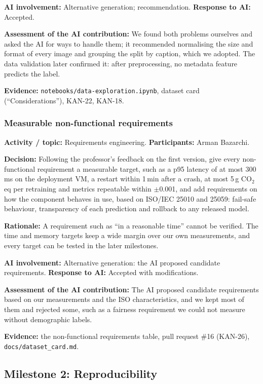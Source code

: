 \documentclass[11pt]{article}
\begin{document}
\noindent\textbf{AI involvement:} Alternative generation; recommendation. \textbf{Response to AI:} Accepted.

\noindent\textbf{Assessment of the AI contribution:} We found both problems ourselves and asked the AI for ways to handle them; it recommended normalising the size and format of every image and grouping the split by caption, which we adopted. The data validation later confirmed it: after preprocessing, no metadata feature predicts the label.

\noindent\textbf{Evidence:} \texttt{notebooks/data-exploration.ipynb}, dataset card (``Considerations''), KAN-22, KAN-18.

\subsubsection{Measurable non-functional requirements}
\noindent\textbf{Activity / topic:} Requirements engineering. \textbf{Participants:} Arman Bazarchi.

\noindent\textbf{Decision:} Following the professor's feedback on the first version, give every non-functional requirement a measurable target, such as a p95 latency of at most 300\,ms on the deployment VM, a restart within 1\,min after a crash, at most 5\,g CO$_2$eq per retraining and metrics repeatable within $\pm$0.001, and add requirements on how the component behaves in use, based on ISO/IEC 25010 and 25059: fail-safe behaviour, transparency of each prediction and rollback to any released model.

\noindent\textbf{Rationale:} A requirement such as ``in a reasonable time'' cannot be verified. The time and memory targets keep a wide margin over our own measurements, and every target can be tested in the later milestones.

\noindent\textbf{AI involvement:} Alternative generation: the AI proposed candidate requirements. \textbf{Response to AI:} Accepted with modifications.

\noindent\textbf{Assessment of the AI contribution:} The AI proposed candidate requirements based on our measurements and the ISO characteristics, and we kept most of them and rejected some, such as a fairness requirement we could not measure without demographic labels.

\noindent\textbf{Evidence:} the non-functional requirements table, pull request \#16 (KAN-26), \texttt{docs/dataset\_card.md}.

\subsection{Milestone 2: Reproducibility}
\end{document}
